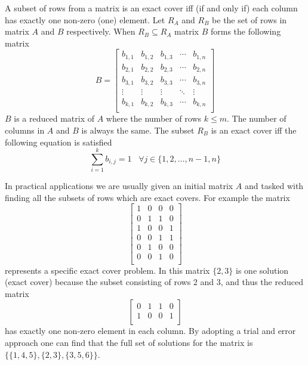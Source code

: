 A subset of rows from a matrix is an exact cover iff (if and only if) each column has exactly one non-zero (one) element.
Let $R_A$ and $R_B$ be the set of rows in matrix $A$ and $B$ respectively.
When $R_B \subseteq R_A$ matrix $B$ forms the following matrix
\begin{equation}
	B =
	\left[
	\begin{array}{ccccc}
		b_{1,1} & b_{1,2} & b_{1,3} & \cdots & b_{1,n} \\
		b_{2,1} & b_{2,2} & b_{2,3} & \cdots & b_{2,n} \\
		b_{3,1} & b_{3,2} & b_{3,3} & \cdots & b_{3,n} \\
		\vdots  & \vdots  & \vdots  & \ddots & \vdots  \\
		b_{k,1} & b_{k,2} & b_{k,3} & \cdots & b_{k,n} \\
	\end{array}
	\right]
	\label{eq:cover_matrix}
\end{equation}
$B$ is a reduced matrix of $A$ where the number of rows $k \leq m$.
The number of columns in $A$ and $B$ is always the same.
The subset $R_B$ is an exact cover iff the following equation is satisfied
\[
	\sum_{i = 1}^{k} b_{i,j} = 1 \;\;\; \forall j \in \{ 1, 2, \ldots, n-1, n \}
\]

In practical applications we are usually given an initial matrix $A$ and tasked with finding all the subsets of rows which are exact covers.
For example the matrix
\begin{equation}
	\left[
	\begin{array}{cccc}
		1 & 0 & 0 & 0 \\
		0 & 1 & 1 & 0 \\
		1 & 0 & 0 & 1 \\
		0 & 0 & 1 & 1 \\
		0 & 1 & 0 & 0 \\
		0 & 0 & 1 & 0 \\
	\end{array}
	\right]
	\label{eq:cover_example}
\end{equation}
represents a specific exact cover problem.
In this matrix $\{ 2, 3 \}$ is one solution (exact cover) because the subset consisting of rows 2 and 3, and thus the reduced matrix
\[
\left[
\begin{array}{cccc}
	0 & 1 & 1 & 0 \\
	1 & 0 & 0 & 1 \\
\end{array}
\right]
\]
has exactly one non-zero element in each column.
By adopting a trial and error approach one can find that the full set of solutions for the matrix is $\{ \{1, 4, 5 \}, \{ 2, 3\}, \{ 3, 5, 6\} \}$.



